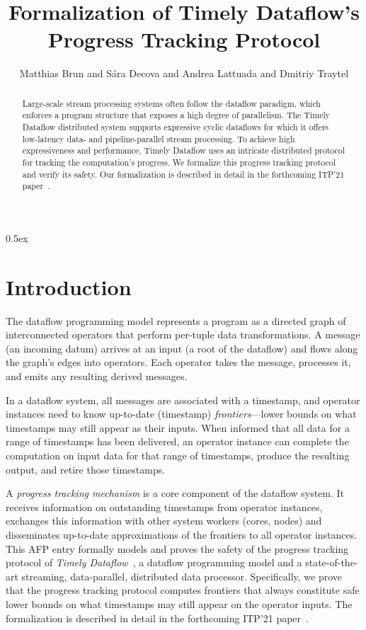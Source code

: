 \documentclass[11pt,a4paper]{article}
\begin{document}
\title{Formalization of Timely Dataflow's\\ Progress Tracking Protocol}
\author{Matthias Brun and S\'ara Decova and Andrea Lattuada and Dmitriy Traytel}

\maketitle

\begin{abstract}
Large-scale stream processing systems often follow the dataflow paradigm, which enforces a program
structure that exposes a high degree of parallelism. The Timely Dataflow distributed system supports
expressive cyclic dataflows for which it offers low-latency data- and pipeline-parallel stream processing.
To achieve high expressiveness and performance, Timely Dataflow uses an intricate distributed protocol
for tracking the computation’s progress. We formalize this progress tracking protocol and verify its safety.
Our formalization is described in detail in the forthcoming ITP'21 paper~\cite{BrunDLT-ITP21}.
\end{abstract}

\tableofcontents

\parindent 0pt\parskip 0.5ex

\section{Introduction}

The dataflow programming model represents a program as a directed graph of interconnected operators
that perform per-tuple data transformations. A message (an incoming datum) arrives at an input (a
root of the dataflow) and flows along the graph's edges into operators. Each operator takes the
message, processes it, and emits any resulting derived messages.

In a dataflow system, all messages are associated with a timestamp, and operator instances need to
know up-to-date (timestamp) \textit{frontiers}---lower bounds on what timestamps may still appear as
their inputs. When informed that all data for a range of timestamps has been delivered, an operator
instance can complete the computation on input data for that range of timestamps, produce the
resulting output, and retire those timestamps.

A \textit{progress tracking mechanism} is a core component of the dataflow system. It receives
information on outstanding timestamps from operator instances, exchanges this information with other
system workers (cores, nodes) and disseminates up-to-date approximations of the frontiers to all
operator instances. This AFP entry formally models and proves the safety of the progress
tracking protocol of \textit{Timely
Dataflow}~\cite{DBLP:conf/sosp/MurrayMIIBA13,URL:timely-dataflow}, a dataflow programming
model and a state-of-the-art streaming, data-parallel, distributed data processor.
Specifically, we
prove that the progress tracking protocol computes frontiers that always constitute safe lower bounds on what
timestamps may still appear on the operator inputs.
The formalization is described in detail in the forthcoming ITP'21 paper~\cite{BrunDLT-ITP21}.
\end{document}
